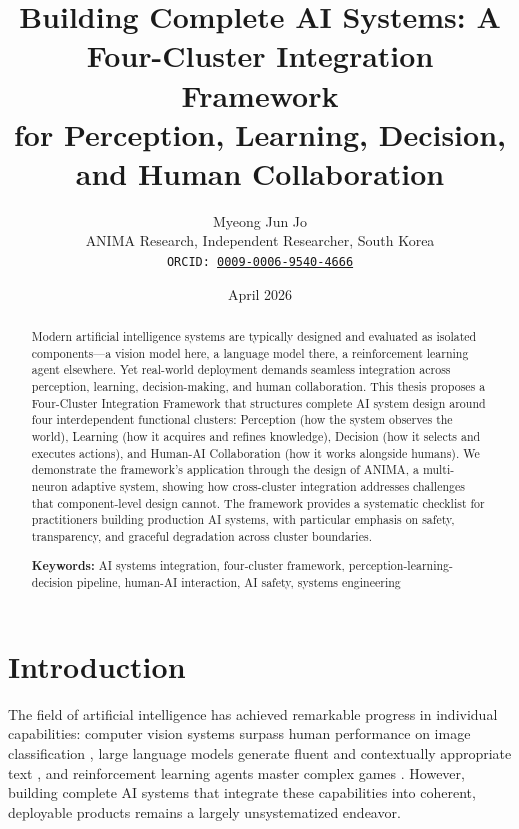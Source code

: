 \documentclass[11pt,a4paper]{article}
\title{%
  \textbf{Building Complete AI Systems: A Four-Cluster Integration Framework\\
  for Perception, Learning, Decision, and Human Collaboration}
}
\author{%
  Myeong Jun Jo \\
  ANIMA Research, Independent Researcher, South Korea \\
  \texttt{ORCID: \href{https://orcid.org/0009-0006-9540-4666}{0009-0006-9540-4666}}
}
\date{April 2026}
\begin{document}
\maketitle

\begin{abstract}
Modern artificial intelligence systems are typically designed and evaluated as isolated components---a vision model here, a language model there, a reinforcement learning agent elsewhere. Yet real-world deployment demands seamless integration across perception, learning, decision-making, and human collaboration. This thesis proposes a Four-Cluster Integration Framework that structures complete AI system design around four interdependent functional clusters: Perception (how the system observes the world), Learning (how it acquires and refines knowledge), Decision (how it selects and executes actions), and Human-AI Collaboration (how it works alongside humans). We demonstrate the framework's application through the design of ANIMA, a multi-neuron adaptive system, showing how cross-cluster integration addresses challenges that component-level design cannot. The framework provides a systematic checklist for practitioners building production AI systems, with particular emphasis on safety, transparency, and graceful degradation across cluster boundaries.

\vspace{6pt}
\noindent\textbf{Keywords:} AI systems integration, four-cluster framework, perception-learning-decision pipeline, human-AI interaction, AI safety, systems engineering
\end{abstract}

\section{Introduction}

The field of artificial intelligence has achieved remarkable progress in individual capabilities: computer vision systems surpass human performance on image classification \citep{he2015}, large language models generate fluent and contextually appropriate text \citep{brown2020}, and reinforcement learning agents master complex games \citep{silver2017}. However, building complete AI systems that integrate these capabilities into coherent, deployable products remains a largely unsystematized endeavor.
\end{document}
